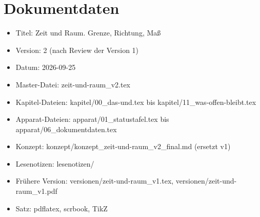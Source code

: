 \chapter{Dokumentdaten}

\begin{itemize}
\item Titel: Zeit und Raum. Grenze, Richtung, Maß
\item Version: 2 (nach Review der Version 1)
\item Datum: 2026-09-25
\item Master-Datei: zeit-und-raum\_v2.tex
\item Kapitel-Dateien: kapitel/00\_das-und.tex bis kapitel/11\_was-offen-bleibt.tex
\item Apparat-Dateien: apparat/01\_statustafel.tex bis apparat/06\_dokumentdaten.tex
\item Konzept: konzept/konzept\_zeit-und-raum\_v2\_final.md (ersetzt v1)
\item Lesenotizen: lesenotizen/
\item Frühere Version: versionen/zeit-und-raum\_v1.tex, versionen/zeit-und-raum\_v1.pdf
\item Satz: pdflatex, scrbook, TikZ
\end{itemize}
